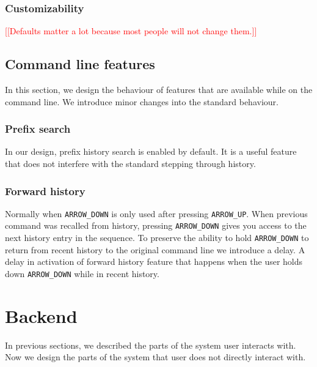 \documentclass[thesis=M,english]{FITthesis}[2012/10/20]
\newcommand{\redtext}[1]{\textcolor{red}{[[#1]]}}
\begin{document}
\subsubsection{Customizability}

\redtext{Defaults matter a lot because most people will not change them.}

\subsection{Command line features}

In this section, we design the behaviour of features that are available while on the command line. We introduce minor changes into the standard behaviour.

\subsubsection{Prefix search}

In our design, prefix history search is enabled by default. It is a useful feature that does not interfere with the standard stepping through history. 

\subsubsection{Forward history}

Normally when \verb|ARROW_DOWN| is only used after pressing \verb|ARROW_UP|. 
When previous command was recalled from history, pressing \verb|ARROW_DOWN| gives you access to the next history entry in the sequence. To preserve the ability to hold \verb|ARROW_DOWN| to return from recent history to the original command line we introduce a delay. A delay in activation of forward history feature that happens when the user holds down \verb|ARROW_DOWN| while in recent history.



\section{Backend}

In previous sections, we described the parts of the system user interacts with.
Now we design the parts of the system that user does not directly interact with.
\end{document}
